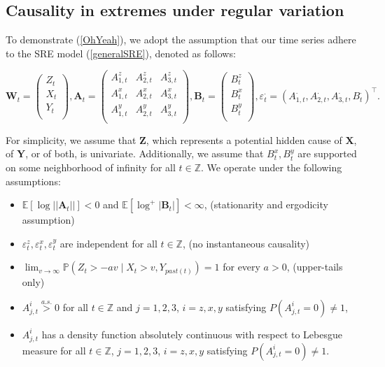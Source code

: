 \documentclass[a4paper,11pt]{article}
\begin{document}
\subsection{Causality in extremes under regular variation}\label{Section_causality_under_RV}
To demonstrate (\ref{OhYeah}), we adopt the assumption that our time series adhere to the SRE model (\ref{generalSRE}), denoted as follows:

\begin{equation}\label{sre2}
\textbf{W}_t = \begin{pmatrix}
Z_t  \\
X_t  \\
Y_t \\
\end{pmatrix}
, 
\textbf{A}_t = \begin{pmatrix}
A^z_{1,t} & A^z_{2,t} & A^z_{3,t} \\
A^x_{1,t} & A^x_{2,t} & A^x_{3,t} \\
A^y_{1,t}& A^y_{2,t} & A^y_{3,t} \\
\end{pmatrix}
, \textbf{B}_t=
\begin{pmatrix}
B^z_{t} \\
B^x_{t}  \\
B^y_{t}  \\
\end{pmatrix}, \varepsilon_t^\cdot = (A^\cdot_{1,t},A^\cdot_{2,t},A^\cdot_{3,t},B^\cdot_t)^\top.
\end{equation}

For simplicity, we assume that \(\textbf{Z}\), which represents a potential hidden cause of \(\textbf{X}\), of \(\textbf{Y}\), or of both, is univariate.
Additionally, we assume that $B^x_t, B^y_t$ are supported on some neighborhood of infinity for all $t\in\mathbb Z$. We operate under the following assumptions:
\begin{itemize}
\item[(B1)] $\mathbb{E}[\log||\textbf{A}_t||] < 0$ and $\mathbb{E}[\log^+|\textbf{B}_t|] < \infty$,  \hfill (stationarity and ergodicity assumption)

\item[(B2)] $\varepsilon_t^{z}, \varepsilon_t^{x}, \varepsilon_t^{y}$ are independent for all $t\in\mathbb{Z}$, \hfill (no instantaneous causality)

\item[(B3)]  $ \lim_{v\to\infty }\mathbb P\left(Z_t>-av\mid X_t>v,Y_{past(t)}\right)= 1$ for every $a>0$, \hfill (upper-tails only)
 
\item[(B4)] $A_{j,t}^i \overset{a.s.}{>} 0$ for all $t\in\mathbb{Z}$ and $j=1,2,3$, $i=z,x,y$ satisfying $P(A_{j,t}^i = 0) \neq 1$,

\item[(B5)] $A_{j,t}^i$ has a density function absolutely continuous with respect to Lebesgue measure for all $t\in\mathbb{Z}$, $j=1,2,3$, $i=z,x,y$ satisfying $P(A_{j,t}^i = 0) \neq 1$.  
\end{itemize}
\end{document}
